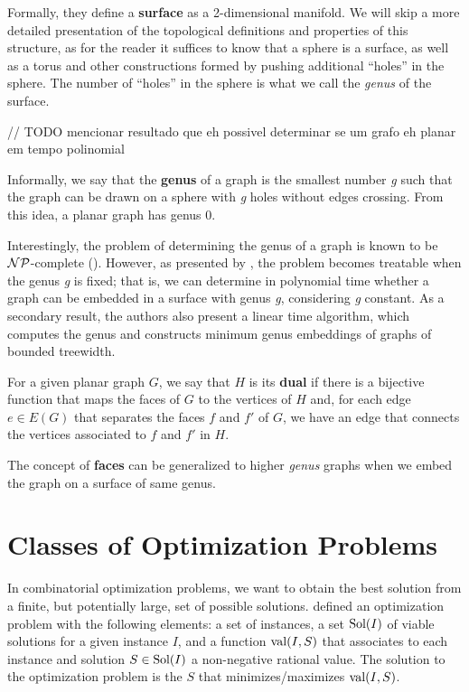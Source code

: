 Formally, they define a \textbf{surface} as a 2-dimensional manifold. We will skip a more detailed presentation of the topological definitions and properties of this structure, as for the reader it suffices to know that a sphere is a surface, as well as a torus and other constructions formed by pushing additional ``holes'' in the sphere. The number of ``holes'' in the sphere is what we call the \textit{genus} of the surface.

// TODO mencionar resultado que eh possivel determinar se um grafo eh planar em tempo polinomial

Informally, we say that the \textbf{genus} of a graph is the smallest number \textit{g} such that the graph can be drawn on a sphere with \textit{g} holes without edges crossing. From this idea, a planar graph has genus 0.

Interestingly, the problem of determining the genus of a graph is known to be \(\mathcal{NP}\)-complete (\cite{THOMASSEN1989568}). However, as presented by \cite{LinearGenus}, the problem becomes treatable when the genus \textit{g} is fixed; that is, we can determine in polynomial time whether a graph can be embedded in a surface with genus \textit{g}, considering \textit{g} constant. As a secondary result, the authors also present a linear time algorithm, which computes the genus and constructs minimum genus embeddings of graphs of bounded treewidth. 

For a given planar graph \(G\), we say that \(H\) is its \textbf{dual} if there is a bijective function that maps the faces of \(G\) to the vertices of \(H\) and, for each edge \(e \in E(G)\) that separates the faces \(f\) and \(f'\) of \(G\), we have an edge that connects the vertices associated to \(f\) and \(f'\) in \(H\).

The concept of \textbf{faces} can be generalized to higher \textit{genus} graphs when we embed the graph on a surface of same genus.

\section{Classes of Optimization Problems}

In combinatorial optimization problems, we want to obtain the best solution from a finite, but potentially large, set of possible solutions. \cite{livroAprox} defined an optimization problem with the following elements: a set of instances, a set \(\operatorname{\textrm{Sol}}(I)\) of viable solutions for a given instance \(I\), and a function \(\operatorname{\textrm{val}} (I, S)\) that associates to each instance and solution \(S \in \operatorname{\textrm{Sol}}(I)\) a non-negative rational value. The solution to the optimization problem is the \(S\) that minimizes/maximizes \(\operatorname{\textrm{val}}(I, S)\).

